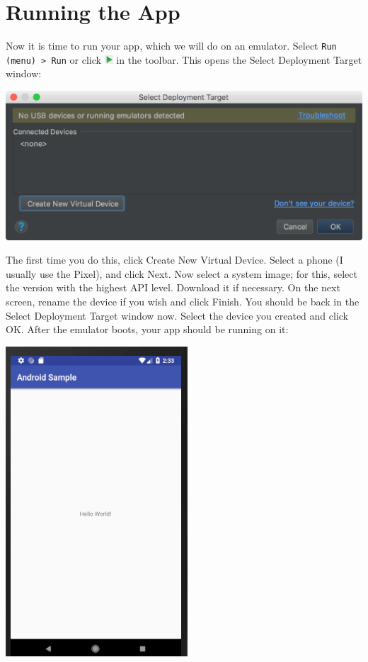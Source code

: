 \documentclass{article}
\begin{document}
\section{Running the App}
Now it is time to run your app, which we will do on an emulator. Select \texttt{Run (menu) > Run} or click \includegraphics[height=9pt]{images/run.png} in the toolbar. This opens the Select Deployment Target window:
\begin{center}\includegraphics[width=.5\textwidth]{images/select-deploy.png}\end{center}
The first time you do this, click Create New Virtual Device. Select a phone (I usually use the Pixel), and click Next. Now select a system image; for this, select the version with the highest API level. Download it if necessary. On the next screen, rename the device if you wish and click Finish. You should be back in the Select Deployment Target window now. Select the device you created and click OK. After the emulator boots, your app should be running on it:
\begin{center}\includegraphics[height=.44\textheight]{images/hello-world.png}\end{center}
\end{document}
